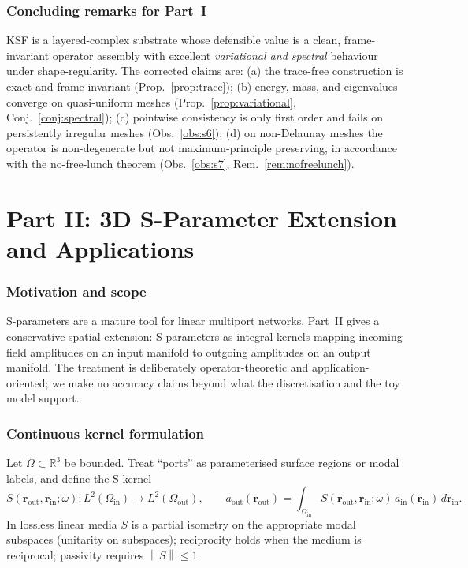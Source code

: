 \documentclass[11pt]{article}
\theoremstyle{plain}
\theoremstyle{definition}
\theoremstyle{remark}
\newcommand{\Real}{\mathbb{R}}
\newcommand{\Om}{\Omega}
\newcommand{\norm}[1]{\left\lVert #1 \right\rVert}
\begin{document}
\section{Concluding remarks for Part~I}
KSF is a layered-complex substrate whose defensible value is a clean,
frame-invariant operator assembly with excellent \emph{variational and spectral}
behaviour under shape-regularity. The corrected claims are: (a) the trace-free
construction is exact and frame-invariant (Prop.~\ref{prop:trace}); (b) energy,
mass, and eigenvalues converge on quasi-uniform meshes
(Prop.~\ref{prop:variational}, Conj.~\ref{conj:spectral}); (c) pointwise
consistency is only first order and fails on persistently irregular meshes
(Obs.~\ref{obs:s6}); (d) on non-Delaunay meshes the operator is non-degenerate
but not maximum-principle preserving, in accordance with the no-free-lunch
theorem (Obs.~\ref{obs:s7}, Rem.~\ref{rem:nofreelunch}).

\part{Part II: 3D S-Parameter Extension and Applications}

\section{Motivation and scope}
S-parameters are a mature tool for linear multiport networks. Part~II gives a
conservative spatial extension: S-parameters as integral kernels mapping
incoming field amplitudes on an input manifold to outgoing amplitudes on an
output manifold. The treatment is deliberately operator-theoretic and
application-oriented; we make no accuracy claims beyond what the discretisation
and the toy model support.

\section{Continuous kernel formulation}
Let $\Om\subset\Real^3$ be bounded. Treat ``ports'' as parameterised surface
regions or modal labels, and define the S-kernel
\[
S(\mathbf r_{\mathrm{out}},\mathbf r_{\mathrm{in}};\omega):
L^2(\Om_{\mathrm{in}})\to L^2(\Om_{\mathrm{out}}),\qquad
a_{\mathrm{out}}(\mathbf r_{\mathrm{out}})
=\int_{\Om_{\mathrm{in}}}
S(\mathbf r_{\mathrm{out}},\mathbf r_{\mathrm{in}};\omega)\,
a_{\mathrm{in}}(\mathbf r_{\mathrm{in}})\,d\mathbf r_{\mathrm{in}}.
\]
In lossless linear media $S$ is a partial isometry on the appropriate modal
subspaces (unitarity on subspaces); reciprocity holds when the medium is
reciprocal; passivity requires $\norm{S}\le 1$.
\end{document}
